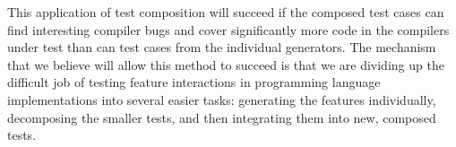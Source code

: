 This application of test composition will succeed if the composed test
 cases can find interesting compiler bugs and cover significantly more
 code in the compilers under test than can test cases from the
 individual generators.
%
The mechanism that we believe will allow this method to succeed is
 that we are dividing up the difficult job of testing feature
 interactions in programming language implementations into several
 easier tasks: generating the features individually, decomposing the
 smaller tests, and then integrating them into new, composed tests.

